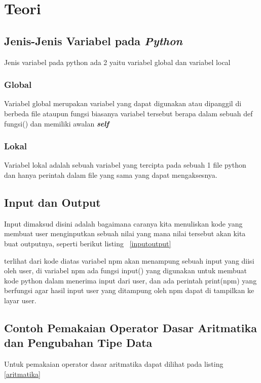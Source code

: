\chapter{Teori}

\section{Jenis-Jenis Variabel pada \textit{Python}}
Jenis variabel pada python ada 2 yaitu variabel global dan variabel local

\subsection{Global}
Variabel global merupakan variabel yang dapat digunakan atau dipanggil di berbeda file ataupun fungsi biasanya variabel tersebut berapa dalam sebuah def fungsi() dan memiliki awalan \textbf{\textit{self}}

\subsection{Lokal}
Variabel lokal adalah sebuah variabel yang tercipta pada sebuah 1 file python dan hanya perintah dalam file yang sama yang dapat mengaksesnya.

\section{Input dan Output}
Input dimaksud disini adalah bagaimana caranya kita menuliskan kode yang membuat user menginputkan sebuah nilai yang mana nilai tersebut akan kita buat outputnya, seperti berikut listing ~\ref{inputoutput}



terlihat dari kode diatas variabel npm akan menampung sebuah input yang diisi oleh user, di variabel npm ada fungsi input() yang digunakan untuk membuat kode python dalam menerima input dari user, dan ada perintah print(npm) yang berfungsi agar hasil input user yang ditampung oleh npm dapat di tampilkan ke layar user.

\section{Contoh Pemakaian Operator Dasar Aritmatika dan Pengubahan Tipe Data}
Untuk pemakaian operator dasar aritmatika dapat dilihat pada listing \ref{aritmatika}

